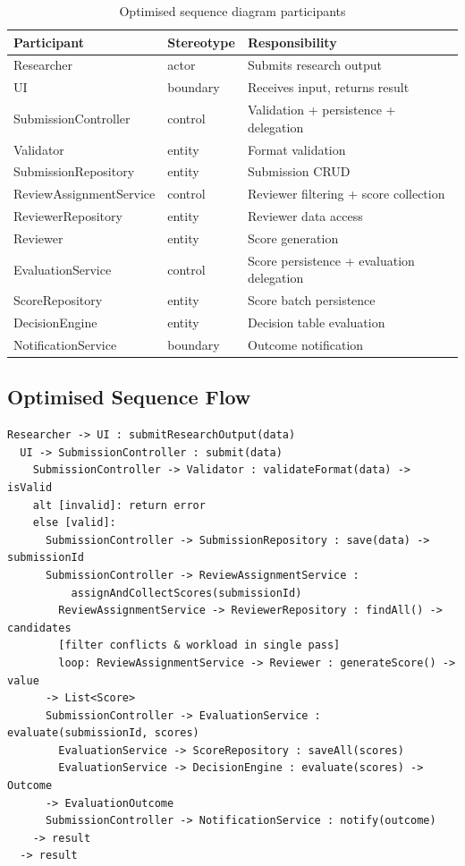 \documentclass[12pt, a4paper]{article}
\begin{document}
\begin{table}[h]
\centering
\caption{Optimised sequence diagram participants}
\label{tab:opt-participants}
\begin{tabularx}{\textwidth}{l l X}
    \toprule
    \textbf{Participant} & \textbf{Stereotype} & \textbf{Responsibility} \\
    \midrule
    Researcher & actor & Submits research output \\
    UI & boundary & Receives input, returns result \\
    SubmissionController & control & Validation + persistence + delegation \\
    Validator & entity & Format validation \\
    SubmissionRepository & entity & Submission CRUD \\
    ReviewAssignmentService & control & Reviewer filtering + score collection \\
    ReviewerRepository & entity & Reviewer data access \\
    Reviewer & entity & Score generation \\
    EvaluationService & control & Score persistence + evaluation delegation \\
    ScoreRepository & entity & Score batch persistence \\
    DecisionEngine & entity & Decision table evaluation \\
    NotificationService & boundary & Outcome notification \\
    \bottomrule
\end{tabularx}
\end{table}

\subsection{Optimised Sequence Flow}

\begin{lstlisting}[style=outputstyle]
Researcher -> UI : submitResearchOutput(data)
  UI -> SubmissionController : submit(data)
    SubmissionController -> Validator : validateFormat(data) -> isValid
    alt [invalid]: return error
    else [valid]:
      SubmissionController -> SubmissionRepository : save(data) -> submissionId
      SubmissionController -> ReviewAssignmentService :
          assignAndCollectScores(submissionId)
        ReviewAssignmentService -> ReviewerRepository : findAll() -> candidates
        [filter conflicts & workload in single pass]
        loop: ReviewAssignmentService -> Reviewer : generateScore() -> value
      -> List<Score>
      SubmissionController -> EvaluationService : evaluate(submissionId, scores)
        EvaluationService -> ScoreRepository : saveAll(scores)
        EvaluationService -> DecisionEngine : evaluate(scores) -> Outcome
      -> EvaluationOutcome
      SubmissionController -> NotificationService : notify(outcome)
    -> result
  -> result
\end{lstlisting}
\end{document}
